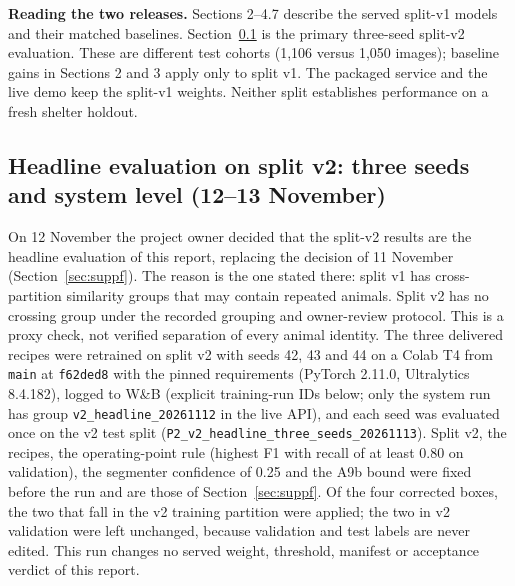 \documentclass[11pt,a4paper]{article}
\newcommand{\ev}[1]{\nolinkurl{#1}}
\begin{document}
\textbf{Reading the two releases.} Sections 2--4.7 describe the served split-v1 models and their matched baselines. Section~\ref{sec:v2seeds} is the primary three-seed split-v2 evaluation. These are different test cohorts (1,106 versus 1,050 images); baseline gains in Sections 2 and 3 apply only to split v1. The packaged service and the live demo keep the split-v1 weights. Neither split establishes performance on a fresh shelter holdout.

\subsection{Headline evaluation on split v2: three seeds and system level (12--13 November)}\label{sec:v2seeds}

On 12 November the project owner decided that the split-v2 results are the headline evaluation of this report, replacing the decision of 11 November (Section~\ref{sec:suppf}). The reason is the one stated there: split v1 has cross-partition similarity groups that may contain repeated animals. Split v2 has no crossing group under the recorded grouping and owner-review protocol. This is a proxy check, not verified separation of every animal identity. The three delivered recipes were retrained on split v2 with seeds 42, 43 and 44 on a Colab T4 from \texttt{main} at \texttt{f62ded8} with the pinned requirements (PyTorch 2.11.0, Ultralytics 8.4.182), logged to W\&B (explicit training-run IDs below; only the system run has group \texttt{v2\_headline\_20261112} in the live API), and each seed was evaluated once on the v2 test split (\ev{P2_v2_headline_three_seeds_20261113}). Split v2, the recipes, the operating-point rule (highest F1 with recall of at least 0.80 on validation), the segmenter confidence of 0.25 and the A9b bound were fixed before the run and are those of Section~\ref{sec:suppf}. Of the four corrected boxes, the two that fall in the v2 training partition were applied; the two in v2 validation were left unchanged, because validation and test labels are never edited. This run changes no served weight, threshold, manifest or acceptance verdict of this report.
\end{document}
